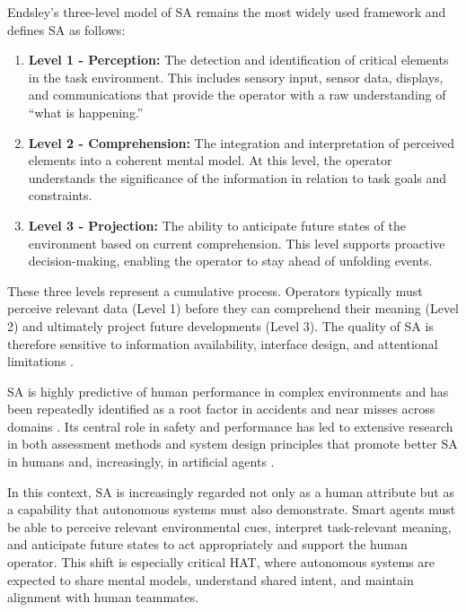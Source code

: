 \documentclass[12pt,a4paper]{article} %
\begin{document}
	Endsley's three-level model of SA \parencite{endsley_measurement_1995} remains the most widely used framework and defines SA as follows:
	\begin{enumerate}
		\item \textbf{Level 1 - Perception:} The detection and identification of critical elements in the task environment. This includes sensory input, sensor data, displays, and communications that provide the operator with a raw understanding of “what is happening.”
		
		\item \textbf{Level 2 - Comprehension:} The integration and interpretation of perceived elements into a coherent mental model. At this level, the operator understands the significance of the information in relation to task goals and constraints.
		
		\item \textbf{Level 3 - Projection:} The ability to anticipate future states of the environment based on current comprehension. This level supports proactive decision-making, enabling the operator to stay ahead of unfolding events.
	\end{enumerate}

	These three levels represent a cumulative process. Operators typically must perceive relevant data (Level 1) before they can comprehend their meaning (Level 2) and ultimately project future developments (Level 3). The quality of SA is therefore sensitive to information availability, interface design, and attentional limitations \parencite{endsley_situation_2015}.

	SA is highly predictive of human performance in complex environments and has been repeatedly identified as a root factor in accidents and near misses across domains \parencite{endsley_systematic_2021}. Its central role in safety and performance has led to extensive research in both assessment methods and system design principles that promote better SA in humans and, increasingly, in artificial agents \parencite{kokar_situation_2012}.

	In this context, SA is increasingly regarded not only as a human attribute but as a capability that autonomous systems must also demonstrate. Smart agents must be able to perceive relevant environmental cues, interpret task-relevant meaning, and anticipate future states to act appropriately and support the human operator. This shift is especially critical HAT, where autonomous systems are expected to share mental models, understand shared intent, and maintain alignment with human teammates.
\end{document}
